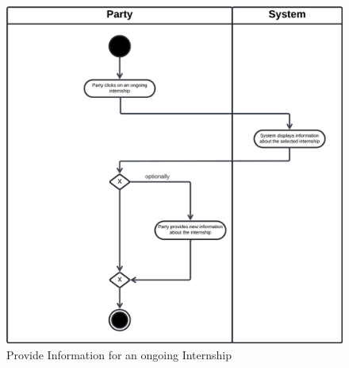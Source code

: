 \begin{figure}[H]
    \begin{center}
         \includegraphics[width=1\linewidth]{LaTeXCode/images/activity diagram/UC15.png}
         \caption{Provide Information for an ongoing Internship}
         \label{fig:provide_information_ongoing_ad}%
     \end{center}
\end{figure}

\newpage

